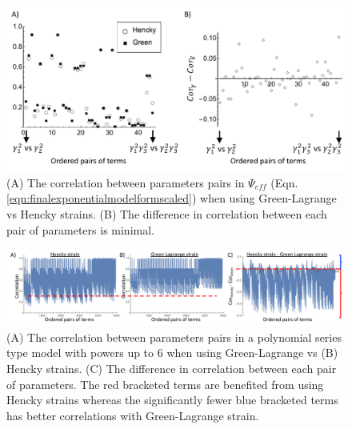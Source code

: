 \begin{figure}
\centering
\includegraphics[width=6.0in]{Images/chapter5/gvsecorrelationeff}
\caption{(A) The correlation between parameters pairs in $\Psi_{eff}$ (Eqn. \ref{eqn:finalexponentialmodelformscaled}) when using Green-Lagrange vs Hencky strains. (B) The difference in correlation between each pair of parameters is minimal.}
\label{fig:gvsecorrelationeff}
\end{figure}


\begin{figure}
\centering
\includegraphics[width=\textwidth]{Images/chapter5/gvsecorrelationpoly}
\caption{(A) The correlation between parameters pairs in a polynomial series type model with powers up to 6 when using Green-Lagrange vs (B) Hencky strains. (C) The difference in correlation between each pair of parameters. The red bracketed terms are benefited from using Hencky strains whereas the significantly fewer blue bracketed terms has better correlations with Green-Lagrange strain.}
\label{fig:gvsecorrelationpoly}
\end{figure}















